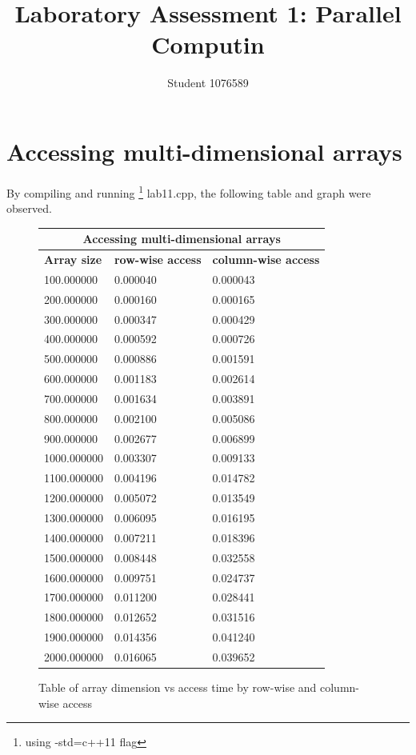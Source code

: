 \documentclass[12pt]{article}
\begin{document}
	 
	 
	\title{Laboratory Assessment 1: Parallel Computin}
	\author{Student 1076589}
	\maketitle
	\pagebreak
	
	\section{Accessing multi-dimensional arrays}
	
	By compiling and running \footnote{using -std=c++11 flag} lab11.cpp, the following table and graph were observed. \newline

	\begin{figure}[H]
		\centering
		\begin{center}
			\begin{tabular}{ |p{4cm}||p{4cm}|p{4cm}|  }
				\hline
				\multicolumn{3}{|c|}{\textbf{Accessing multi-dimensional arrays}} \\
				\hline
				\textbf{Array size} & \textbf{row-wise access} & \textbf{column-wise access}\\
				\hline
					100.000000 & 0.000040 & 0.000043 \\
					200.000000 & 0.000160 & 0.000165 \\
					300.000000 & 0.000347 & 0.000429 \\
					400.000000 & 0.000592 & 0.000726 \\
					500.000000 & 0.000886 & 0.001591 \\
					600.000000 & 0.001183 & 0.002614 \\
					700.000000 & 0.001634 & 0.003891 \\
					800.000000 & 0.002100 & 0.005086 \\
					900.000000 & 0.002677 & 0.006899 \\
					1000.000000 & 0.003307 & 0.009133\\
					1100.000000 & 0.004196 & 0.014782\\
					1200.000000 & 0.005072 & 0.013549\\
					1300.000000 & 0.006095 & 0.016195\\
					1400.000000 & 0.007211 & 0.018396\\
					1500.000000 & 0.008448 & 0.032558\\
					1600.000000 & 0.009751 & 0.024737\\
					1700.000000 & 0.011200 & 0.028441\\
					1800.000000 & 0.012652 & 0.031516\\
					1900.000000 & 0.014356 & 0.041240\\
					2000.000000 & 0.016065 & 0.039652\\
				\hline
			\end{tabular}
		\end{center}		
		\caption{Table of array dimension vs access time by row-wise and column-wise access}
	\end{figure}
\end{document}
